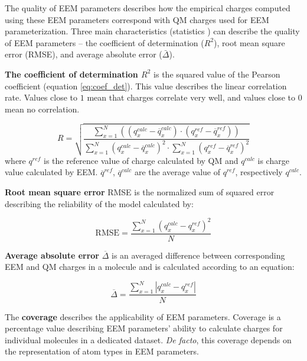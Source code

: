 The quality of EEM parameters describes how the empirical charges computed
using these EEM parameters correspond with QM charges used for EEM
parameterization. Three main characteristics (statistics \cite{Urdan2011, Verzani2018})
can describe the quality of EEM parameters -- the coefficient of determination ($R^2$),
root mean square error (RMSE), and average absolute error ($\bar{\Delta}$).

\textbf{The coefficient of determination $R^2$} is the squared value of the
Pearson coefficient (equation \ref{eq:coef_det}). This value describes the
linear correlation rate. Values close to $1$ mean that charges correlate very well,
and values close to $0$ mean no correlation.

\begin{equation} \label{eq:coef_det}
    R = \sqrt{\frac{
        \sum^N_{x=1}{((q^{calc}_x - \overline{q}^{calc}_x) \cdot (q^{ref}_x - \overline{q}^{ref}_x))}
    }{
        \sum^N_{x=1}{(q^{calc}_x - \overline{q}^{calc}_x)^2} \cdot \sum^N_{x=1}{(q^{ref}_x - \overline{q}^{ref}_x)^2}
    }}
\end{equation}
where $q^{ref}$ is the reference value of charge calculated by QM and $q^{calc}$
is charge value calculated by EEM. $\overline{q}^{ref}$, $\overline{q}^{calc}$
are the average value of $q^{ref}$, respectively $q^{calc}$.

\textbf{Root mean square error} RMSE is the normalized sum of squared error
describing the reliability of the model calculated by:

\begin{equation}
    \mathrm{RMSE} = \frac{
        \sum^N_{x=1}{(q^{calc}_x - q^{ref}_x)^2}
    }{
        N
    }
\end{equation}

\textbf{Average absolute error} $\overline{\Delta}$ is an averaged difference
between corresponding EEM and QM charges in a molecule and is calculated
according to an equation:

\begin{equation}
    \overline{\Delta} = \frac{
        \sum^N_{x=1}{|q^{calc}_x - q^{ref}_x|}
    }{
        N
    }
\end{equation}

The \textbf{coverage} describes the applicability of EEM parameters.
Coverage is a percentage value describing EEM parameters' ability to calculate
charges for individual molecules in a dedicated dataset. \textit{De facto},
this coverage depends on the representation of atom types in EEM parameters.

